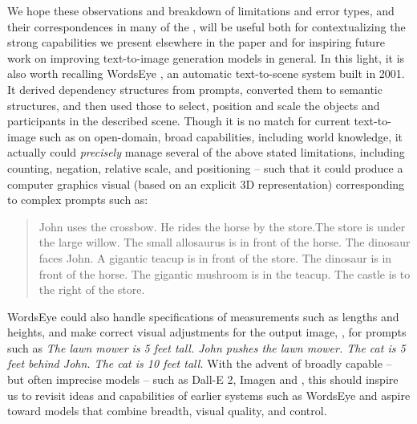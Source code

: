 We hope these observations and breakdown of limitations and error types, and their correspondences in many of the \bcp, will be useful both for contextualizing the strong capabilities we present elsewhere in the paper and for inspiring future work on improving text-to-image generation models in general. In this light, it is also worth recalling WordsEye \cite{coyne2001wordseye}, an automatic text-to-scene system built in 2001. It derived dependency structures from prompts, converted them to semantic structures, and then used those to select, position and scale the objects and participants in the described scene. Though it is no match for current text-to-image such as \bdraw on open-domain, broad capabilities, including world knowledge, it actually could \textit{precisely} manage several of the above stated limitations, including counting, negation, relative scale, and positioning -- such that it could produce a computer graphics visual (based on an explicit 3D representation) corresponding to complex prompts such as:

\begin{quote}
John uses the crossbow. He rides the horse by the store.The store is under the large willow. The small allosaurus is in front of the horse. The dinosaur faces John. A gigantic teacup is in front of the store. The dinosaur is in front of the horse. The gigantic mushroom is in the teacup. The castle is to the right of the store.
\end{quote}

\noindent
WordsEye could also handle specifications of measurements such as lengths and heights, and make correct visual adjustments for the output image, \eg, for prompts such as \textit{The lawn mower is 5 feet tall. John pushes the lawn mower. The cat is 5 feet behind John. The cat is 10 feet tall.} With the advent of broadly capable -- but often imprecise models -- such as Dall-E 2, Imagen and \bdraw, this should inspire us to revisit ideas and capabilities of earlier systems such as WordsEye and aspire toward models that combine breadth, visual quality, and control.
